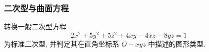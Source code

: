 \subsubsection{二次型与曲面方程}


\begin{example}
    转换一般二次型方程 $$2x^2+5y^2+5z^2+4xy-4xz-8yz=1$$
    为标准二次型, 并判定其在直角坐标系 $O-xyz$ 中描述的图形类型.
\end{example}
